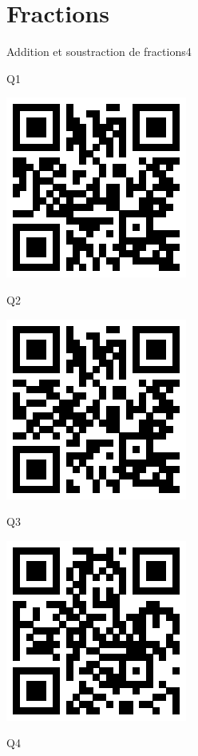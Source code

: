 \documentclass[a4paper,11pt]{report}
\begin{document}
\section*{Fractions}
\begin{qmoodle}{Addition et soustraction de fractions}{4}{
	\begin{center}
		Q1

		\includegraphics[scale=1]{img/no3fractions/asfq/asfq_1}
	\end{center}
	\begin{center}
		Q2

		\includegraphics[scale=1]{img/no3fractions/asfq/asfq_2}
	\end{center}
	\begin{center}
		Q3

		\includegraphics[scale=1]{img/no3fractions/asfq/asfq_3}
	\end{center}
	\begin{center}
		Q4


\end{center}}
\end{qmoodle}
\end{document}
